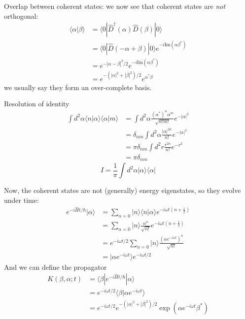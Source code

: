 Overlap between coherent states: we now see that coherent states are \emph{not} orthogonal:
\begin{align*}
    \langle \alpha |\beta \rangle &=\langle 0|\hat{D}^{\dagger}\left( \alpha \right) \hat{D}\left( \beta \right) |0\rangle \\
    &=\langle 0|\hat{D}\left( -\alpha +\beta \right) |0\rangle e^{-i\mathrm{Im}\left( \alpha \beta ^* \right)}\\
    &=e^{-\left| \alpha -\beta \right|^2/2}e^{-i\mathrm{Im}\left( \alpha \beta ^* \right)}\\
    &=e^{-\left( \left| \alpha \right|^2+\left| \beta \right|^2 \right) /2}e^{\alpha ^*\beta}
\end{align*}
we usually say they form an over-complete basis.

Resolution of identity
\begin{align*}
    \int{d^2\alpha \langle n|\alpha \rangle \langle \alpha |m\rangle}&=\int{d^2\alpha \frac{\left( \alpha ^* \right) ^n\alpha ^m}{\sqrt{n!m!}}e^{-\left| \alpha \right|^2}}\\
    &=\delta _{nm}\int{d^2\alpha \frac{\left| \alpha \right|^{2n}}{n!}e^{-\left| \alpha \right|^2}}\\
    &=\pi \delta _{nm}\int{d^2r\frac{r^{2n}}{n!}e^{-r^2}}\\
    &=\pi \delta _{nm}
\end{align*}
\[ I=\frac{1}{\pi}\int{d^2\alpha |\alpha \rangle \langle \alpha |}\]

Now, the coherent states are not (generally) energy eigenstates, so they evolve under time:
\begin{align*}
    e^{-i\hat{H}t/\hbar}|\alpha \rangle &=\sum_{n=0}{|n\rangle \langle n|\alpha \rangle e^{-i\omega t\left( n+\frac{1}{2} \right)}}\\
    &=\sum_{n=0}{|n\rangle \frac{\alpha ^n}{\sqrt{n!}}e^{-i\omega t\left( n+\frac{1}{2} \right)}}\\
    &=e^{-i\omega t/2}\sum_{n=0}{|n\rangle \frac{\left( \alpha e^{-i\omega t} \right) ^n}{\sqrt{n!}}}\\
    &=|\alpha e^{-i\omega t}\rangle e^{-i\omega t/2}
\end{align*}
And we can define the propagator
\begin{align*}
    K\left( \beta ,\alpha ;t \right) &=\langle \beta |e^{-i\hat{H}t/\hbar}|\alpha \rangle \\
    &=e^{-i\omega t/2}\langle \beta |\alpha e^{-i\omega t}\rangle\\
    &=e^{-i\omega t/2}e^{-\left( \left| \alpha \right|^2+\left| \beta \right|^2 \right) /2}\exp \left( \alpha e^{-i\omega t}\beta ^* \right)
\end{align*}

